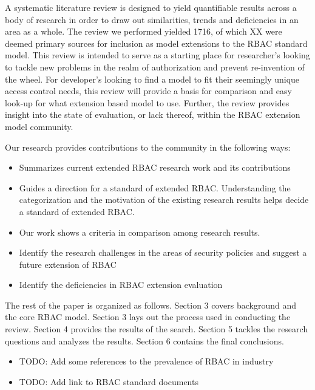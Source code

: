 A systematic literature review is designed to yield quantifiable results across a body of research in order to draw out similarities, trends and deficiencies in an area as a whole.  The review we performed yielded 1716, of which XX were deemed primary sources for inclusion as model extensions to the RBAC standard model.  This review is intended to serve as a starting place for researcher's looking to tackle new problems in the realm of authorization and prevent re-invention of the wheel. For developer's looking to find a model to fit their seemingly unique access control needs, this review will provide a basis for comparison and easy look-up for what extension based model to use.  Further, the review provides insight into the state of evaluation, or lack thereof, within the RBAC extension model community.

Our research provides contributions to the community in the following ways:

\begin{itemize}
\item Summarizes current extended RBAC research work and its contributions
\item Guides a direction for a standard of extended RBAC. Understanding the categorization and the motivation of the existing research results helps decide a standard of extended RBAC.
\item Our work shows a criteria in comparison among research results.
\item Identify the research challenges in the areas of security policies and suggest a future extension of RBAC
\item Identify the deficiencies in RBAC extension evaluation
\end{itemize}

The rest of the paper is organized as follows.  Section 3 covers background and the core RBAC model. Section 3 lays out the process used in conducting the review. Section 4 provides the results of the search. Section 5 tackles the research questions and analyzes the results.  Section 6 contains the final conclusions.

\begin{itemize}
\item TODO: Add some references to the prevalence of RBAC in industry
\item TODO: Add link to RBAC standard documents
\end{itemize}
